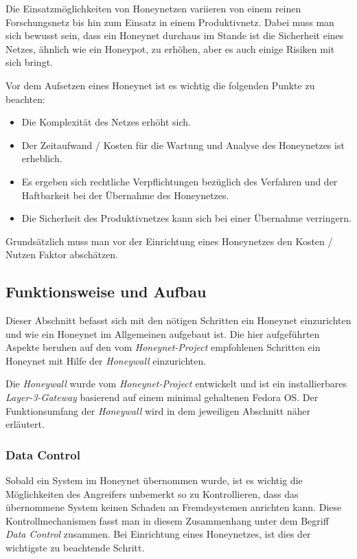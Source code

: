 Die Einsatzmöglichkeiten von Honeynetzen variieren von einem reinen
Forschungsnetz bis hin zum Einsatz in einem Produktivnetz. Dabei muss
man sich bewusst sein, dass ein Honeynet durchaus im Stande ist die
Sicherheit eines Netzes, ähnlich wie ein Honeypot, zu erhöhen, aber es
auch einige Risiken mit sich bringt.

Vor dem Aufsetzen eines Honeynet ist es wichtig die folgenden Punkte
zu beachten:
\begin{itemize}
  \item Die Komplexität des Netzes erhöht sich.
  \item Der Zeitaufwand / Kosten für die Wartung und Analyse des
Honeynetzes ist erheblich.
  \item Es ergeben sich rechtliche Verpflichtungen bezüglich des
Verfahren und der Haftbarkeit bei der Übernahme des Honeynetzes.
  \item Die Sicherheit des Produktivnetzes kann sich bei einer
Übernahme verringern.
\end{itemize} 

Grundsätzlich muss man vor der Einrichtung eines
Honeynetzes den Kosten / Nutzen Faktor abschätzen.

\subsection{Funktionsweise und Aufbau} Dieser Abschnitt befasst sich
mit den nötigen Schritten ein Honeynet einzurichten und wie ein
Honeynet im Allgemeinen aufgebaut ist. Die hier aufgeführten Aspekte
beruhen auf den vom \textit{Honeynet-Project} empfohlenen Schritten
ein Honeynet mit Hilfe der \textit{Honeywall} einzurichten.

Die \textit{Honeywall} wurde vom \textit{Honeynet-Project} entwickelt
und ist ein installierbares \textit{Layer-3-Gateway} basierend auf
einem minimal gehaltenen Fedora OS. Der Funktionsumfang der
\textit{Honeywall} wird in dem jeweiligen Abschnitt näher erläutert.

\subsubsection{Data Control} Sobald ein System im Honeynet übernommen
wurde, ist es wichtig die Möglichkeiten des Angreifers unbemerkt so zu
Kontrollieren, dass das übernommene System keinen Schaden an
Fremdsystemen anrichten kann. Diese Kontrollmechanismen fasst man in
diesem Zusammenhang unter dem Begriff \textit{Data Control}
zusammen. Bei Einrichtung eines Honeynetzes, ist dies der wichtigste
zu beachtende Schritt.

